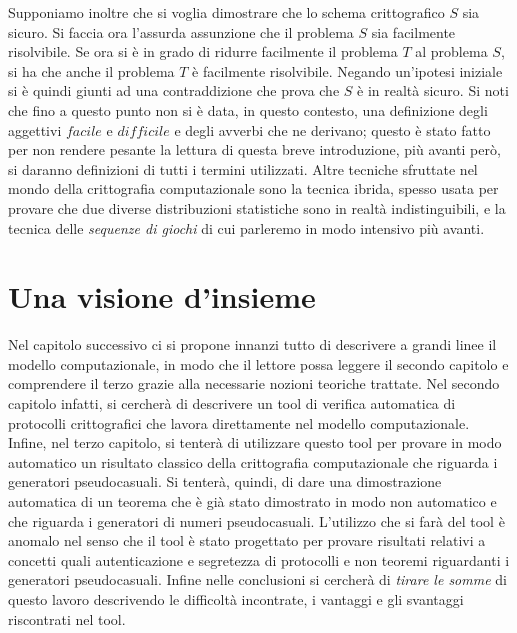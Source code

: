 \documentclass[a4paper,openright,twoside,12pt]{report}
\begin{document}
Supponiamo inoltre che si voglia dimostrare che lo schema crittografico $S$
sia sicuro. Si faccia ora l'assurda assunzione che il problema $S$ sia facilmente risolvibile. 
Se ora si \`e in grado di ridurre facilmente il problema $T$ al problema $S$, si ha che anche il problema $T$ \`e facilmente risolvibile.
Negando un'ipotesi iniziale si \`e quindi giunti ad una contraddizione che prova che $S$ \`e in realt\`a sicuro.
Si noti che fino a questo punto non si \`e data, in questo contesto, una definizione degli aggettivi $facile$ e $difficile$ e degli avverbi che ne derivano; 
questo \`e stato fatto per non rendere pesante la lettura di questa breve introduzione, pi\`u avanti per\`o, si daranno definizioni
di tutti i termini utilizzati.
Altre tecniche sfruttate nel mondo della crittografia computazionale sono la tecnica ibrida, spesso usata
per provare che due diverse distribuzioni statistiche sono in realt\`a indistinguibili, e la tecnica delle \emph{sequenze di giochi} di cui parleremo
in modo intensivo pi\`u avanti.
\section*{Una visione d'insieme}
Nel capitolo successivo ci si propone innanzi tutto di descrivere a grandi linee il modello computazionale, 
in modo che il lettore possa leggere il secondo capitolo e comprendere il terzo grazie alla necessarie
nozioni teoriche trattate. Nel secondo capitolo infatti, si cercher\`a di descrivere un tool di verifica 
automatica di protocolli crittografici che lavora direttamente nel modello computazionale. Infine, nel terzo capitolo,
si tenter\`a di utilizzare questo tool per provare in modo automatico un risultato classico della crittografia
computazionale che riguarda i generatori pseudocasuali. Si tenter\`a, quindi, di dare una dimostrazione automatica di un teorema che \`e gi\`a stato
dimostrato in modo non automatico e che riguarda i generatori di numeri pseudocasuali. L'utilizzo che si far\`a del tool \`e anomalo 
nel senso che il tool \`e stato progettato
per provare risultati relativi a concetti quali autenticazione e segretezza di protocolli e non teoremi riguardanti
i generatori pseudocasuali.
Infine nelle conclusioni si cercher\`a di \emph{tirare le somme} di questo lavoro descrivendo le difficolt\`a incontrate,
i vantaggi e gli svantaggi riscontrati nel tool.
\end{document}

